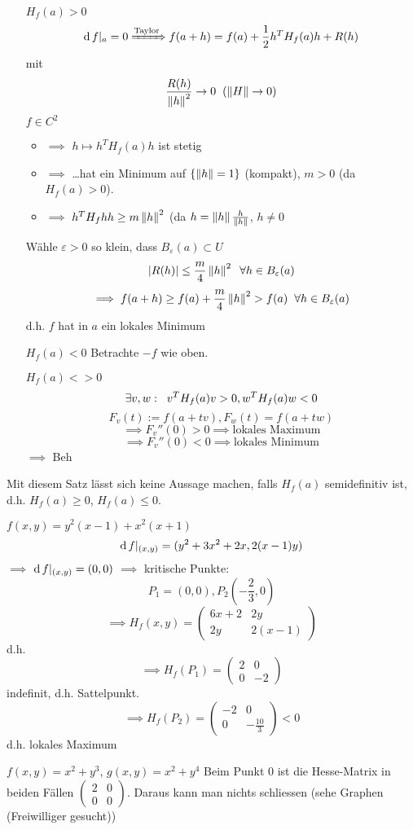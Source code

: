 \begin{Bew}
  \begin{itemize}
    \item[$H_f(a)>0$]
      \[\operatorname{d} f|_a=0\xRightarrow{\text{Taylor}}f(a+h)=f(a)+\frac{1}{2}h^TH_f(a)h+R(h)\\\]
      mit
      \[\frac{R(h)}{\left\| h \right\|^2}\rightarrow 0 \hspace{2mm}(\left\| H \right\|\rightarrow 0)\]
      $f\in C^2$
      \begin{itemize}
        \item $\implies$ $h\mapsto h^TH_f(a)h$ ist stetig
        \item $\implies$ \ldots hat ein Minimum auf $\left\{ \left\| h \right\|=1 \right\}$ (kompakt), $m > 0$ (da $H_f(a)>0$).
        \item $\implies$ $h^TH_f hh\geq m\left\| h \right\|^2$ (da $h=\left\| h \right\|\frac{h}{\left\| h \right\|}$, $h\neq 0$
      \end{itemize}
      Wähle $\varepsilon>0$ so klein, dass $B_\varepsilon(a)\subset U$
      \[\mathopen| R(h) \mathclose|\leq \frac{m}{4}\left\| h \right\|^2\hspace{2mm}\forall h\in B_\varepsilon(a)\]
      \[\implies f(a+h)\geq f(a)+\frac{m}{4}\left\| h \right\|^2>f(a)\hspace{2mm}\forall h\in B_\varepsilon(a)\]
      d.h. $f$ hat in $a$ ein lokales Minimum
    \item[$H_f(a)<0$]
       Betrachte $-f$ wie oben.
    \item[$H_f(a)<>0$] %
      \[\exists v,w :\hspace{2mm} v^T H_f(a) v>0, w^T H_f(a) w<0\]
      \[F_v(t):=f(a+tv), F_w(t)=f(a+tw)\]
      \[\implies F_v''(0)>0 \implies \text{lokales Maximum}\]
      \[\implies F_v''(0)<0 \implies \text{lokales Minimum}\]
      $\implies$ Beh
  \end{itemize}
\end{Bew}
\begin{Bem}
  Mit diesem Satz lässt sich keine Aussage machen, falls $H_f(a)$ semidefinitiv ist, d.h. $H_f(a)\geq 0$, $H_f(a)\leq 0$.
\end{Bem}
\begin{Bsp}
  $f(x,y)=y^2(x-1)+x^2(x+1)$
  \[\operatorname{d} f|_{(x,y)} = (y^2+3x^2+2x, 2(x-1)y)\]
  $\implies$ $\operatorname{d} f|_{(x,y)}=(0,0)$ $\implies$ kritische Punkte:
  \[P_1=(0,0), P_2(-\frac{2}{3}, 0)\]
  \[\implies H_f(x,y)= \begin{pmatrix}
    6x+2&2y\\
    2y&2(x-1)
  \end{pmatrix}\]
  d.h.
  \[\implies H_f(P_1)= \begin{pmatrix}
    2&0\\
    0&-2
  \end{pmatrix}\]
  indefinit, d.h. Sattelpunkt.
  \[\implies H_f(P_2)= \begin{pmatrix}
    -2&0\\
    0&-\frac{10}{3}
  \end{pmatrix}<0\]
  d.h. lokales Maximum
\end{Bsp}
\begin{Bsp}
  $f(x,y)=x^2+y^3$, $g(x,y)=x^2+y^4$
  Beim Punkt 0 ist die Hesse-Matrix in beiden Fällen $\begin{pmatrix} 2&0\\ 0&0 \end{pmatrix}$. Daraus kann man nichts schliessen (sehe Graphen (Freiwilliger gesucht))
\end{Bsp}
